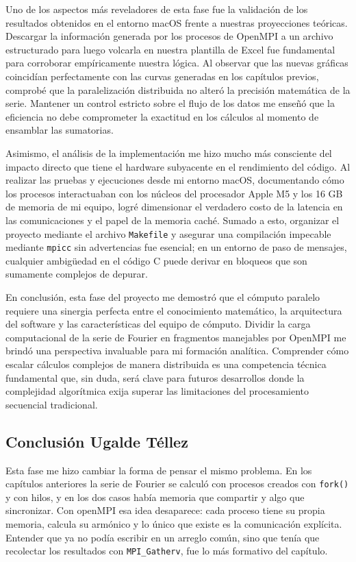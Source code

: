 Uno de los aspectos más reveladores de esta fase fue la validación de los resultados obtenidos en el entorno macOS frente a nuestras proyecciones teóricas. Descargar la información generada por los procesos de OpenMPI a un archivo estructurado para luego volcarla en nuestra plantilla de Excel fue fundamental para corroborar empíricamente nuestra lógica. Al observar que las nuevas gráficas coincidían perfectamente con las curvas generadas en los capítulos previos, comprobé que la paralelización distribuida no alteró la precisión matemática de la serie. Mantener un control estricto sobre el flujo de los datos me enseñó que la eficiencia no debe comprometer la exactitud en los cálculos al momento de ensamblar las sumatorias.

Asimismo, el análisis de la implementación me hizo mucho más consciente del impacto directo que tiene el hardware subyacente en el rendimiento del código. Al realizar las pruebas y ejecuciones desde mi entorno macOS, documentando cómo los procesos interactuaban con los núcleos del procesador Apple M5 y los 16 GB de memoria de mi equipo, logré dimensionar el verdadero costo de la latencia en las comunicaciones y el papel de la memoria caché. Sumado a esto, organizar el proyecto mediante el archivo \texttt{Makefile} y asegurar una compilación impecable mediante \texttt{mpicc} sin advertencias fue esencial; en un entorno de paso de mensajes, cualquier ambigüedad en el código C puede derivar en bloqueos que son sumamente complejos de depurar.

En conclusión, esta fase del proyecto me demostró que el cómputo paralelo requiere una sinergia perfecta entre el conocimiento matemático, la arquitectura del software y las características del equipo de cómputo. Dividir la carga computacional de la serie de Fourier en fragmentos manejables por OpenMPI me brindó una perspectiva invaluable para mi formación analítica. Comprender cómo escalar cálculos complejos de manera distribuida es una competencia técnica fundamental que, sin duda, será clave para futuros desarrollos donde la complejidad algorítmica exija superar las limitaciones del procesamiento secuencial tradicional.

\clearpage
\subsection*{Conclusión Ugalde Téllez}

Esta fase me hizo cambiar la forma de pensar el mismo problema. En los capítulos anteriores la serie de Fourier se calculó con procesos creados con \texttt{fork()} y con hilos, y en los dos casos había memoria que compartir y algo que sincronizar. Con openMPI esa idea desaparece: cada proceso tiene su propia memoria, calcula su armónico y lo único que existe es la comunicación explícita. Entender que ya no podía escribir en un arreglo común, sino que tenía que recolectar los resultados con \texttt{MPI\_Gatherv}, fue lo más formativo del capítulo.

